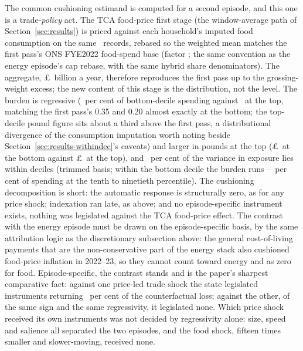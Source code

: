 The common cushioning estimand is computed for a second episode, and
this one is a trade-\emph{policy} act. The TCA food-price first stage
(the window-average path of Section~\ref{sec:results}) is priced
against each household's imputed food consumption on the same
\SsHouseholdsRecords\ records, rebased so the weighted mean matches
the first pass's ONS FYE2022 food-spend base (factor
\SsTcaSsFoodRebase; the same convention as the energy episode's cap
rebase, with the same hybrid share denominators). The aggregate,
\pounds\SsTcaSsAggBn\ billion a year, therefore reproduces the first
pass up to the grossing-weight excess; the new content of this stage
is the distribution, not the level.
The burden is regressive (\SsTcaSsPctSpendDecOne\ per cent of
bottom-decile spending against \SsTcaSsPctSpendDecTen\ at the top,
matching the first pass's 0.35 and 0.20 almost exactly at the bottom;
the top-decile pound figure sits about a third above the first pass,
a distributional divergence of the consumption imputation worth
noting beside Section~\ref{sec:results-withindec}'s caveats) and larger in pounds at the top
(\pounds\SsTcaSsGbpDecOne\ at the bottom against
\pounds\SsTcaSsGbpDecTen\ at the top), and \SsTcaSsWithinPct\ per cent of the variance in exposure
lies within deciles (trimmed basis; within the bottom decile the
burden runs \SsTcaSsPTenDecOne--\SsTcaSsPNinetyDecOne\ per cent of
spending at the tenth to ninetieth percentile). The cushioning
decomposition is short: the automatic response is
structurally zero, as for any price shock; indexation ran late, as
above; and no episode-specific instrument exists, nothing was
legislated against the TCA food-price effect. The contrast with the
energy episode must be drawn on the episode-specific basis, by the
same attribution logic as the discretionary subsection above: the
general cost-of-living payments that are the non-conservative part of
the energy stack also cushioned food-price inflation in 2022--23, so
they cannot count toward energy and as zero for food. Episode-specific,
the contrast stands and is the paper's sharpest comparative fact:
against one price-led trade shock the state legislated instruments
returning \SsGridPaperEbssRatePct\ per cent of the counterfactual
loss; against the other, of the same sign and the same regressivity,
it legislated none. Which price shock received its own instruments was not decided by
regressivity alone: size, speed and salience all separated the two
episodes, and the food shock, fifteen times smaller and slower-moving,
received none.

